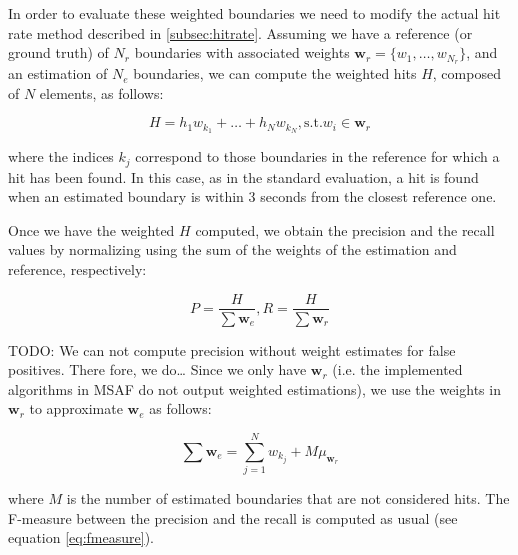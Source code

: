 \documentclass{article}
\begin{document}
In order to evaluate these weighted boundaries we need to modify the actual hit rate method described in \ref{subsec:hitrate}.
Assuming we have a reference (or ground truth) of $N_r$ boundaries with associated weights $\textbf{w}_r = \{w_1, \ldots, w_{N_r}\}$, and an estimation of $N_e$ boundaries, we can compute the weighted hits $H$, composed of $N$ elements, as follows:

\begin{equation}
  H = h_1 w_{k_1} + \ldots + h_N w_{k_N}, \mbox{s.t.} w_i \in \textbf{w}_r
\end{equation}

where the indices $k_j$ correspond to those boundaries in the reference for which a hit has been found.
In this case, as in the standard evaluation, a hit is found when an estimated boundary is within 3 seconds from the closest reference one.

Once we have the weighted $H$ computed, we obtain the precision and the recall values by normalizing using the sum of the weights of the estimation and reference, respectively:

\begin{equation}
  P = \frac{H}{\sum \textbf{w}_e} , R = \frac{H}{\sum \textbf{w}_r}
\end{equation}

TODO: We can not compute precision without weight estimates for false positives.
There fore, we do\dots
Since we only have $\textbf{w}_r$ (i.e. the implemented algorithms in MSAF do not output weighted estimations), we use the weights in $\textbf{w}_r$ to approximate $\textbf{w}_e$ as follows:

\begin{equation}
  \sum \textbf{w}_e = \sum_{j = 1}^{N} w_{k_j} + M \mu_{\textbf{w}_r}
\end{equation}

where $M$ is the number of estimated boundaries that are not considered hits.
The F-measure between the precision and the recall is computed as usual (see equation \ref{eq:fmeasure}).




\end{document}
